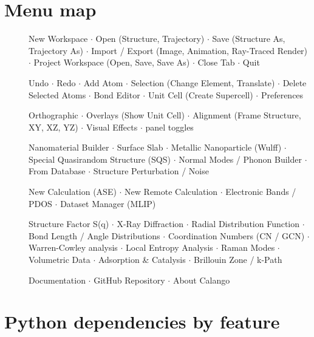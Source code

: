 \section{Menu map}

\begin{description}
  \item[] New Workspace $\cdot$ Open (Structure, Trajectory)
    $\cdot$ Save (Structure As, Trajectory As) $\cdot$ Import / Export
    (Image, Animation, Ray-Traced Render) $\cdot$ Project Workspace (Open,
    Save, Save As) $\cdot$ Close Tab $\cdot$ Quit
  \item[] Undo $\cdot$ Redo $\cdot$ Add Atom $\cdot$ Selection
    (Change Element, Translate) $\cdot$ Delete Selected Atoms $\cdot$ Bond
    Editor $\cdot$ Unit Cell (Create Supercell) $\cdot$ Preferences
  \item[] Orthographic $\cdot$ Overlays (Show Unit Cell) $\cdot$
    Alignment (Frame Structure, XY, XZ, YZ) $\cdot$ Visual Effects $\cdot$
    panel toggles
  \item[] Nanomaterial Builder $\cdot$ Surface Slab $\cdot$
    Metallic Nanoparticle (Wulff) $\cdot$ Special Quasirandom Structure
    (SQS) $\cdot$ Normal Modes / Phonon Builder $\cdot$ From Database
    $\cdot$ Structure Perturbation / Noise
  \item[] New Calculation (ASE) $\cdot$ New Remote
    Calculation $\cdot$ Electronic Bands / PDOS $\cdot$ Dataset Manager
    (MLIP)
  \item[] Structure Factor S(q) $\cdot$ X-Ray Diffraction
    $\cdot$ Radial Distribution Function $\cdot$ Bond Length / Angle
    Distributions $\cdot$ Coordination Numbers (CN / GCN) $\cdot$
    Warren-Cowley analysis $\cdot$ Local Entropy Analysis $\cdot$ Raman
    Modes $\cdot$ Volumetric Data $\cdot$ Adsorption \& Catalysis $\cdot$
    Brillouin Zone / k-Path
  \item[] Documentation $\cdot$ GitHub Repository $\cdot$ About
    Calango
\end{description}

\section{Python dependencies by feature}

